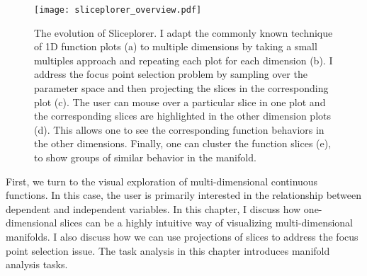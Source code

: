 
\begin{figure}
  \centering
  \texttt{[image: sliceplorer\_overview.pdf]}
  \caption{
    The evolution of Sliceplorer. I adapt the commonly known technique of
    1D function plots (a) to
    multiple dimensions by taking a small multiples approach and repeating each
    plot for each dimension (b). I address the
    focus point selection problem by sampling over the parameter space and then
    projecting the slices in the corresponding plot
    (c). The user can mouse over a particular
    slice in one plot and the corresponding slices are highlighted in the other
    dimension plots (d). This allows one to
    see the corresponding function behaviors in the other dimensions.  Finally,
    one can cluster the function slices (e), to
    show groups of similar behavior in the manifold.
  }
  \label{fig:walkthrough}
\end{figure}

First, we turn to the visual exploration of multi-dimensional continuous
functions. In this case, the user is primarily interested in the relationship
between dependent and independent variables. In this chapter, I discuss how
one-dimensional slices can be a highly intuitive way of visualizing
multi-dimensional manifolds. I also discuss how we can use projections of 
slices to address the focus point selection issue. The task analysis in this
chapter introduces manifold analysis tasks.











